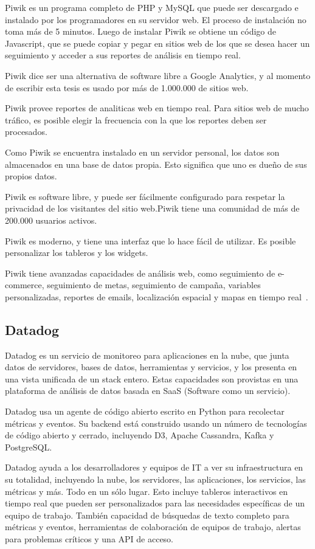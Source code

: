 Piwik es un programa completo de PHP y MySQL que puede ser descargado e
instalado por los programadores en su servidor web. El proceso de instalación
no toma más de 5 minutos. Luego de instalar Piwik se obtiene un código de
Javascript, que se puede copiar y pegar en sitios web de los que se desea hacer
un seguimiento y acceder a sus reportes de análisis en tiempo real.

Piwik dice ser una alternativa de software libre a Google Analytics, y al
momento de escribir esta tesis es usado por más de 1.000.000 de sitios web.

Piwik provee reportes de analiticas web en tiempo real. Para sitios web de
mucho tráfico, es posible elegir la frecuencia con la que los reportes deben
ser procesados.

Como Piwik se encuentra instalado en un servidor personal, los datos son
almacenados en una base de datos propia. Esto significa que uno es dueño de sus
propios datos.

Piwik es software libre, y puede ser fácilmente configurado para respetar la
privacidad de los visitantes del sitio web.Piwik tiene una comunidad de más de
200.000 usuarios activos.

Piwik es moderno, y tiene una interfaz que lo hace fácil de utilizar. Es
posible personalizar los tableros y los widgets.

Piwik tiene avanzadas capacidades de análisis web, como seguimiento de
e-commerce, seguimiento de metas, seguimiento de campaña, variables
personalizadas, reportes de emails, localización espacial y mapas en tiempo
real~\cite{piwik}.

\subsection{Datadog}

Datadog es un servicio de monitoreo para aplicaciones en la nube, que junta
datos de servidores, bases de datos, herramientas y servicios, y los presenta
en una vista unificada de un stack entero. Estas capacidades son provistas en
una plataforma de análisis de datos  basada en SaaS (Software como un
servicio).

Datadog usa un agente de código abierto escrito en Python para recolectar
métricas y eventos. Su backend está construido usando un número de tecnologías
de código abierto y cerrado, incluyendo D3, Apache Cassandra, Kafka y
PostgreSQL.

Datadog ayuda a los desarrolladores y equipos de IT a ver su infraestructura en
su totalidad, incluyendo la nube, los servidores, las aplicaciones, los
servicios, las métricas y más. Todo en un sólo lugar. Esto incluye tableros
interactivos en tiempo real que pueden ser personalizados para las necesidades
específicas de un equipo de trabajo. También capacidad de búsquedas de texto
completo para métricas y eventos, herramientas de colaboración de equipos de
trabajo, alertas para problemas críticos y una API de acceso.


